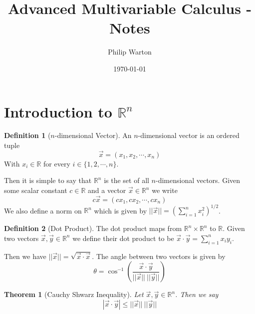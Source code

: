 \documentclass{article}
\newtheorem{theorem}{Theorem}[section]
\theoremstyle{definition}
\newtheorem{definition}{Definition}[section]
\begin{document}
\title{Advanced Multivariable Calculus - Notes}
\author{Philip Warton}
\date{\today}
\maketitle
\section{Introduction to $\mathbb{R}^n$}
\begin{mdframed}[]
    \begin{definition}[$n$-dimensional Vector]
        An $n$-dimensional vector is an ordered tuple
        \[
            \vec{x} = (x_1, x_2, \cdots , x_n)
        \]
        With $x_i \in \mathbb{R}$ for every $i \in \{1,2,\cdots, n\}$.
    \end{definition}
\end{mdframed}
Then it is simple to say that $\mathbb{R}^n$ is the set of all $n$-dimensional vectors.
Given some scalar constant $c \in \mathbb{R}$ and a vector $\vec{x} \in \mathbb{R}^n$ we write 
\[
    c\vec{x} = (cx_1, cx_2, \cdots , cx_n)
\]
We also define a norm on $\mathbb{R}^n$ which is given by $||\vec{x}|| = \left(\sum_{i=1}^n x_i^2\right)^{1 / 2}$.
\begin{definition}[Dot Product]
    The dot product maps from $\mathbb{R}^n \times \mathbb{R}^n$ to $\mathbb{R}$.
    Given two vectors $\vec x , \vec y \in \mathbb{R}^n$ we define their dot product to be 
    $\vec x \cdot \vec y  = \sum_{i=1}^n x_i y_i$.
\end{definition}
Then we have $||\vec x|| = \sqrt{\vec x \cdot \vec x}$.
The angle between two vectors is given by 
\[
    \theta = \cos^{-1}\left(\frac{\vec x \cdot \vec y}{||\vec x|| \ ||\vec y ||}\right)
\]
\begin{mdframed}\begin{theorem}
    [Cauchy Shwarz Inequality]
    Let $\vec x , \vec y \in \mathbb{R}^n$. Then we say
    \[
        |\vec x \cdot \vec y| \leqslant ||\vec x|| \ || \vec y ||
    \]
\end{theorem}
\end{mdframed}
\end{document}
